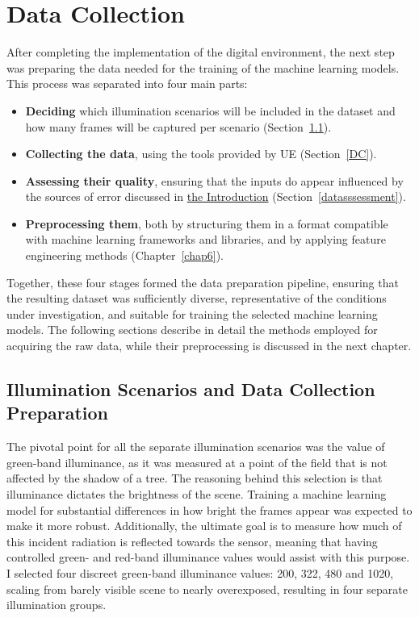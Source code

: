 \chapter{Data Collection}
\label{chap5}

After completing the implementation of the digital environment, the next step was preparing the data needed for the training of the machine learning models. This process was separated into four main parts:

\begin{itemize}
    \item \textbf{Deciding} which illumination scenarios will be included in the dataset and how many frames will be captured per scenario (Section~\ref{illum-scenarios-sec}).
    \item \textbf{Collecting the data}, using the tools provided by UE (Section~\ref{DC}).
    \item \textbf{Assessing their quality}, ensuring that the inputs do appear influenced by the sources of error discussed in \hyperref[chap1]{the Introduction} (Section~\ref{datasssessment}).
    \item \textbf{Preprocessing them}, both by structuring them in a format compatible with machine learning frameworks and libraries, and by applying feature engineering methods (Chapter~\ref{chap6}).
\end{itemize}

Together, these four stages formed the data preparation pipeline, ensuring that the resulting dataset was sufficiently diverse, representative of the conditions under investigation, and suitable for training the selected machine learning models. The following sections describe in detail the methods employed for acquiring the raw data, while their preprocessing is discussed in the next chapter.

\section{Illumination Scenarios and Data Collection Preparation}

\label{illum-scenarios-sec}

The pivotal point for all the separate illumination scenarios was the value of green-band illuminance, as it was measured at a point of the field that is not affected by the shadow of a tree. The reasoning behind this selection is that illuminance dictates the brightness of the scene. Training a machine learning model for substantial differences in how bright the frames appear was expected to make it more robust. Additionally, the ultimate goal is to measure how much of this incident radiation is reflected towards the sensor, meaning that having controlled green- and red-band illuminance values would assist with this purpose. I selected four discreet green-band illuminance values: 200, 322, 480 and 1020, scaling from barely visible scene to nearly overexposed, resulting in four separate illumination groups.

